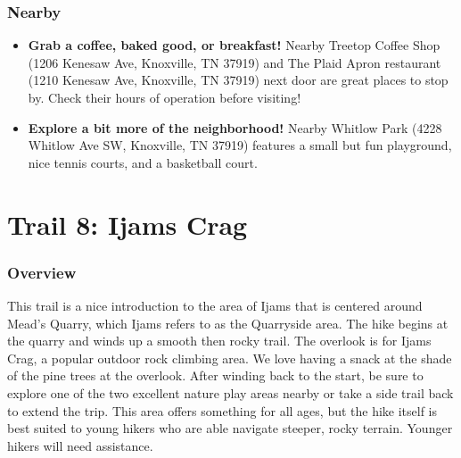 \documentclass[
  letterpaper,
  DIV=11,
  numbers=noendperiod]{scrreprt}
\providecommand{\tightlist}{%
  \setlength{\itemsep}{0pt}\setlength{\parskip}{0pt}}\usepackage{longtable,booktabs,array}
\begin{document}
\subsection{Nearby}\label{nearby-6}

\begin{itemize}
\tightlist
\item
  \textbf{Grab a coffee, baked good, or breakfast!} Nearby Treetop
  Coffee Shop (1206 Kenesaw Ave, Knoxville, TN 37919) and The Plaid
  Apron restaurant (1210 Kenesaw Ave, Knoxville, TN 37919) next door are
  great places to stop by. Check their hours of operation before
  visiting!
\item
  \textbf{Explore a bit more of the neighborhood!} Nearby Whitlow Park
  (4228 Whitlow Ave SW, Knoxville, TN 37919) features a small but fun
  playground, nice tennis courts, and a basketball court.
\end{itemize}

\chapter{Trail 8: Ijams Crag}\label{trail-8-ijams-crag}

\subsection{Overview}\label{overview-8}

This trail is a nice introduction to the area of Ijams that is centered
around Mead's Quarry, which Ijams refers to as the Quarryside area. The
hike begins at the quarry and winds up a smooth then rocky trail. The
overlook is for Ijams Crag, a popular outdoor rock climbing area. We
love having a snack at the shade of the pine trees at the overlook.
After winding back to the start, be sure to explore one of the two
excellent nature play areas nearby or take a side trail back to extend
the trip. This area offers something for all ages, but the hike itself
is best suited to young hikers who are able navigate steeper, rocky
terrain. Younger hikers will need assistance.
\end{document}
